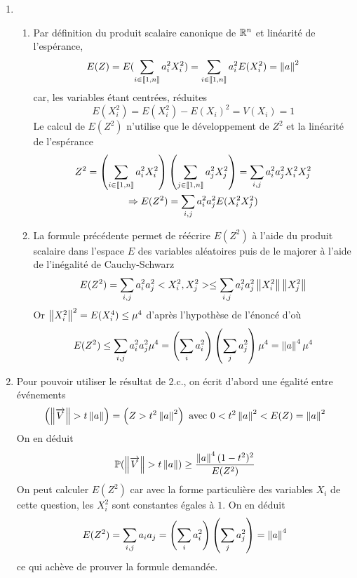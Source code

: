 \begin{enumerate}
  \item
\begin{enumerate}
  \item Par définition du produit scalaire canonique de $\mathbb{R}^n$ et linéarité de l'espérance,
\begin{displaymath}
E(Z) =E(\sum_{i\in \llbracket 1,n\rrbracket}a_i^2X_i^2) = \sum_{i\in \llbracket 1,n\rrbracket}a_i^2E(X_i^2) = \left\Vert a\right\Vert^2  
\end{displaymath}
car, les variables étant centrées, réduites
\begin{displaymath}
  E(X_i^2) = E(X_i^2) - E(X_i)^2= V(X_i)=1
\end{displaymath}
Le calcul de $E(Z^2)$ n'utilise que le développement de $Z^2$ et la linéarité de l'espérance
\begin{multline*}
Z^2 = \left(\sum_{i\in \llbracket 1,n\rrbracket}a_i^2X_i^2 \right) \left(\sum_{j\in \llbracket 1,n\rrbracket}a_j^2X_j^2 \right)
=\sum_{i,j}a_i^2a_j^2X_i^2X_j^2\\
\Rightarrow
E(Z^2)= \sum_{i,j}a_i^2a_j^2 E(X_i^2X_j^2)
\end{multline*}

  \item La formule précédente permet de réécrire $E(Z^2)$ à l'aide du produit scalaire dans l'espace $E$ des variables aléatoires puis de le majorer à l'aide de l'inégalité de Cauchy-Schwarz
\begin{displaymath}
E(Z^2) = \sum_{i,j}a_i^2a_j^2 <X_i^2 ,X_j^2>
\leq  \sum_{i,j}a_i^2a_j^2 \left\Vert X_i^2\right\Vert\left\Vert X_j^2\right\Vert
\end{displaymath}
Or $\left\Vert X_i^2\right\Vert^2 = E(X_i^4)\leq \mu^4$ d'après l'hypothèse de l'énoncé d'où
\begin{displaymath}
E(Z^2) \leq \sum_{i,j}a_i^2a_j^2 \mu ^4
= \left(\sum_i a_i^2\right)\left(\sum_j a_j^2\right)\mu^4 = \left\Vert a\right\Vert^4\mu^4   
\end{displaymath}

\end{enumerate}

  \item Pour pouvoir utiliser le résultat de 2.c., on écrit d'abord une égalité entre événements
\begin{displaymath}
  \left( \left\Vert\overrightarrow{V}\right\Vert>t\left\Vert a\right\Vert\right) = \left( Z > t^2\left\Vert a\right\Vert^2\right)  \text{ avec } 0< t^2\left\Vert a\right\Vert^2 < E(Z)=\left\Vert a\right\Vert^2
\end{displaymath}
On en déduit
\begin{displaymath}
\mathbb{P}(\left\Vert\overrightarrow{V}\right\Vert>t\left\Vert a\right\Vert)\geq \frac{\left\Vert a\right\Vert^4(1-t^2)^2}{E(Z^2)}   
\end{displaymath}
On peut calculer $E(Z^2)$ car avec la forme particulière des variables $X_i$ de cette question, les $X_i^2$ sont constantes égales à $1$. On en déduit
\begin{displaymath}
  E(Z^2) = \sum_{i,j} a_ia_j = \left(\sum_ia_i^2 \right) \left(\sum_j a_j^2 \right) = \left\Vert a\right\Vert^4 
\end{displaymath}
ce qui achève de prouver la formule demandée.
\end{enumerate}
